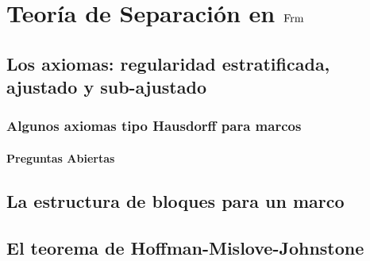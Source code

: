 \chapter{Teoría de Separación en $\mathrm{Frm}$}
\section{Los axiomas: regularidad estratificada, ajustado y sub-ajustado}
\subsection{Algunos axiomas tipo Hausdorff para marcos}
\subsubsection{Preguntas Abiertas}
\section{La estructura de bloques para un marco}
\section{El teorema de Hoffman-Mislove-Johnstone}